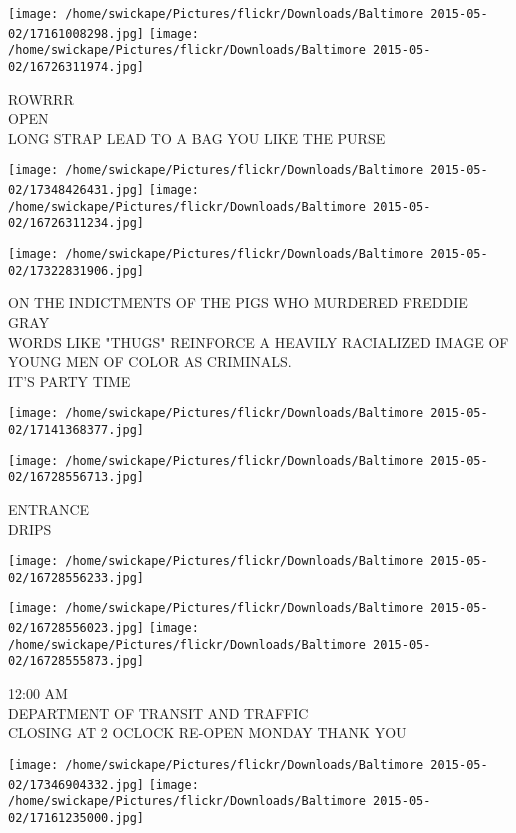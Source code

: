 \documentclass[10pt,letterpaper]{article}
\begin{document}
\vspace{0.25in}
\texttt{[image: /home/swickape/Pictures/flickr/Downloads/Baltimore 2015-05-02/17161008298.jpg]}
\texttt{[image: /home/swickape/Pictures/flickr/Downloads/Baltimore 2015-05-02/16726311974.jpg]}

ROWRRR\\
OPEN\\
LONG STRAP LEAD TO A BAG YOU LIKE THE PURSE
\pagebreak

\texttt{[image: /home/swickape/Pictures/flickr/Downloads/Baltimore 2015-05-02/17348426431.jpg]}
\texttt{[image: /home/swickape/Pictures/flickr/Downloads/Baltimore 2015-05-02/16726311234.jpg]}

\texttt{[image: /home/swickape/Pictures/flickr/Downloads/Baltimore 2015-05-02/17322831906.jpg]}

ON THE INDICTMENTS OF THE PIGS WHO MURDERED FREDDIE GRAY\\
WORDS LIKE "THUGS" REINFORCE A HEAVILY RACIALIZED IMAGE OF YOUNG MEN OF COLOR AS CRIMINALS.\\
IT'S PARTY TIME
\pagebreak

\texttt{[image: /home/swickape/Pictures/flickr/Downloads/Baltimore 2015-05-02/17141368377.jpg]}

\vspace{0.25in}
\texttt{[image: /home/swickape/Pictures/flickr/Downloads/Baltimore 2015-05-02/16728556713.jpg]}

ENTRANCE\\
DRIPS
\pagebreak

\texttt{[image: /home/swickape/Pictures/flickr/Downloads/Baltimore 2015-05-02/16728556233.jpg]}

\vspace{0.25in}
\texttt{[image: /home/swickape/Pictures/flickr/Downloads/Baltimore 2015-05-02/16728556023.jpg]}
\texttt{[image: /home/swickape/Pictures/flickr/Downloads/Baltimore 2015-05-02/16728555873.jpg]}

12:00 AM\\
DEPARTMENT OF TRANSIT AND TRAFFIC\\
CLOSING AT 2 OCLOCK RE{-}OPEN MONDAY THANK YOU
\pagebreak

\texttt{[image: /home/swickape/Pictures/flickr/Downloads/Baltimore 2015-05-02/17346904332.jpg]}
\texttt{[image: /home/swickape/Pictures/flickr/Downloads/Baltimore 2015-05-02/17161235000.jpg]}
\end{document}
